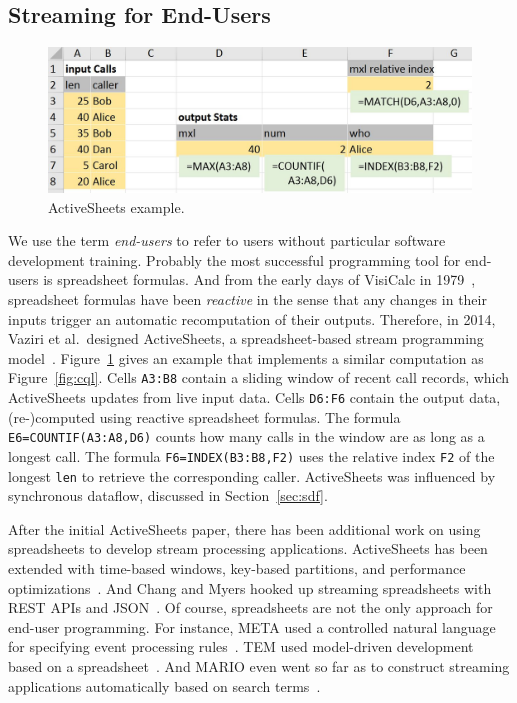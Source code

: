 \subsection{Streaming for End-Users}\label{sec:eup} %

\begin{figure}[!h]
\centerline{\includegraphics[width=\columnwidth]{CallStats.jpg}}
\vspace*{-4mm}
\caption{\label{fig:activesheets}ActiveSheets example.}
\end{figure}

We use the term \emph{end-users} to refer to users without particular
software development training. Probably the most successful
programming tool for end-users is spreadsheet formulas. And from the
early days of VisiCalc in 1979~\cite{bricklin_frankston_1979},
spreadsheet formulas have been \emph{reactive} in the sense that any
changes in their inputs trigger an automatic recomputation of their
outputs. Therefore, in 2014, Vaziri et al.\ designed \textsf{ActiveSheets}, a
spreadsheet-based stream programming model~\cite{vaziri_et_al_2014}.
Figure~\ref{fig:activesheets} gives an example that implements a
similar computation as Figure~\ref{fig:cql}.
Cells \lstinline{A3:B8} contain a sliding window of recent call
records, which ActiveSheets updates from live input data. Cells
\lstinline{D6:F6} contain the output data, \mbox{(re-)}com\-pu\-ted
using reactive spreadsheet formulas. The formula
\mbox{\lstinline{E6=COUNTIF(A3:A8,D6)}} counts how many calls in the
window are as long as a longest call. The formula
\mbox{\lstinline{F6=INDEX(B3:B8,F2)}} uses the relative index \lstinline{F2}
of the longest \lstinline{len} to retrieve the corresponding
caller.  ActiveSheets was influenced by
synchronous dataflow, discussed in Section~\ref{sec:sdf}.

After the initial ActiveSheets paper, there has been additional work
on using spreadsheets to develop stream processing applications.
ActiveSheets has been extended with time-based windows, key-based
partitions, and performance optimizations~\cite{hirzel_et_al_2016}.
And Chang and Myers hooked up streaming spreadsheets with REST APIs and
JSON~\cite{chang_myers_2015}.  Of course, spreadsheets are not the
only approach for end-user programming. For instance, META used a
controlled natural language for specifying event processing
rules~\cite{arnold_et_al_2016}. TEM used model-driven development
based on a spreadsheet~\cite{etzion_et_al_2016}. And MARIO even went
so far as to construct streaming applications automatically based on
search terms~\cite{riabov_et_al_2008}.
